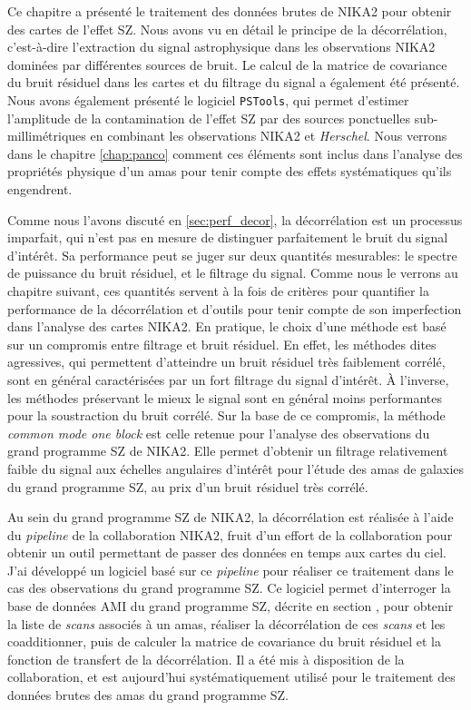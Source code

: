 Ce chapitre a présenté le traitement des données brutes de NIKA2 pour obtenir des cartes de l'effet SZ.
Nous avons vu en détail le principe de la décorrélation, c'est-à-dire l'extraction du signal astrophysique dans les observations NIKA2 dominées par différentes sources de bruit.
Le calcul de la matrice de covariance du bruit résiduel dans les cartes et du filtrage du signal a également été présenté.
Nous avons également présenté le logiciel \texttt{PSTools}, qui permet d'estimer l'amplitude de la contamination de l'effet SZ par des sources ponctuelles sub-millimétriques en combinant les observations NIKA2 et \textit{Herschel}.
Nous verrons dans le chapitre \ref{chap:panco} comment ces éléments sont inclus dans l'analyse des propriétés physique d'un amas pour tenir compte des effets systématiques qu'ils engendrent.

Comme nous l'avons discuté en \ref{sec:perf_decor}, la décorrélation est un processus imparfait, qui n'est pas en mesure de distinguer parfaitement le bruit du signal d'intérêt.
Sa performance peut se juger sur deux quantités mesurables: le spectre de puissance du bruit résiduel, et le filtrage du signal.
Comme nous le verrons au chapitre suivant, ces quantités servent à la fois de critères pour quantifier la performance de la décorrélation et d'outils pour tenir compte de son imperfection dans l'analyse des cartes NIKA2.
En pratique, le choix d'une méthode est basé sur un compromis entre filtrage et bruit résiduel.
En effet, les méthodes dites agressives, qui permettent d'atteindre un bruit résiduel très faiblement corrélé, sont en général caractérisées par un fort filtrage du signal d'intérêt.
À l'inverse, les méthodes préservant le mieux le signal sont en général moins performantes pour la soustraction du bruit corrélé.
Sur la base de ce compromis, la méthode \textit{common mode one block} est celle retenue pour l'analyse des observations du grand programme SZ de NIKA2.
Elle permet d'obtenir un filtrage relativement faible du signal aux échelles angulaires d'intérêt pour l'étude des amas de galaxies du grand programme SZ, au prix d'un bruit résiduel très corrélé.

Au sein du grand programme SZ de NIKA2, la décorrélation est réalisée à l'aide du \textit{pipeline} de la collaboration NIKA2, fruit d'un effort de la collaboration pour obtenir un outil permettant de passer des données en temps aux cartes du ciel.
J'ai développé un logiciel basé sur ce \textit{pipeline} pour réaliser ce traitement dans le cas des observations du grand programme SZ.
Ce logiciel permet d'interroger la base de données AMI du grand programme SZ, décrite en section , pour obtenir la liste de \textit{scans} associés à un amas, réaliser la décorrélation de ces \textit{scans} et les coadditionner, puis de calculer la matrice de covariance du bruit résiduel et la fonction de transfert de la décorrélation.
Il a été mis à disposition de la collaboration, et est aujourd'hui systématiquement utilisé pour le traitement des données brutes des amas du grand programme SZ.


